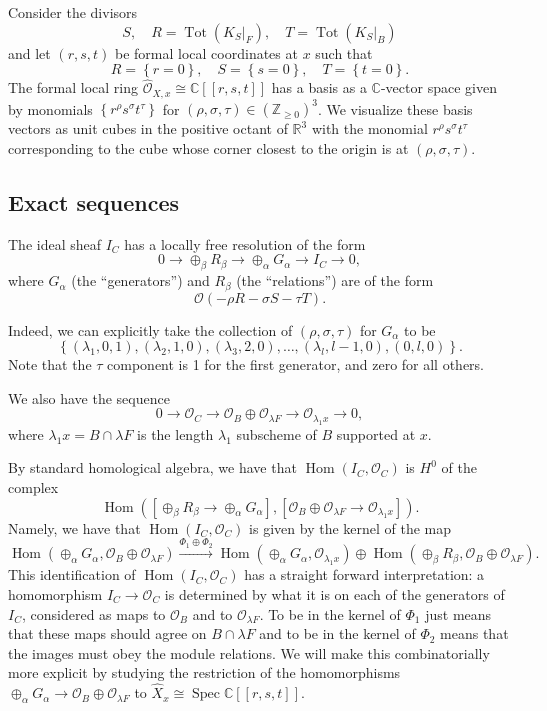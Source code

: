 \documentclass[12pt]{amsart}
\theoremstyle{definition}
\newcommand{\CC} {\mathbb{C}}          %
\newcommand{\RR} {\mathbb{R}}		%
\newcommand{\ZZ} {\mathbb{Z}}		%
\renewcommand{\O}{\mathcal{O}}
\newcommand{\Hom}{\operatorname{Hom}}
\newcommand{\Tot}{\operatorname{Tot}}
\newcommand{\Spec}{\operatorname{Spec}}
\begin{document}
Consider the divisors
\[
S,\quad R=\Tot (K_{S}|_{F}),\quad T=\Tot (K_{S}|_{B})
\]
and let $(r,s,t)$ be formal local coordinates at $x$ such that 
\[
R=\left\{r=0 \right\},\quad S=\left\{s=0 \right\},\quad T=\left\{t=0 \right\}.
\]
The formal local ring $\widehat{\O}_{X,x}\cong \CC [[r,s,t]]$ has a basis
as a $\CC$-vector space given by monomials
$\left\{r^{\rho}s^{\sigma}t^{\tau} \right\}$ for $(\rho, \sigma,
\tau)\in \left(\ZZ_{\geq 0} \right)^{3}$. We visualize these basis
vectors as unit cubes in the positive octant of $\RR^{3}$ with the
monomial $r^{\rho}s^{\sigma}t^{\tau}$ corresponding to the cube whose
corner closest to the origin is at $(\rho ,\sigma ,\tau)$.


\subsection{Exact sequences}

The ideal sheaf $I_{C}$ has a locally free resolution of the form
\begin{equation}\label{eqn: R-->G-->I_C exact sequence}
0\to \oplus_{\beta}R_{\beta} \to \oplus_{\alpha }G_{\alpha } \to I_{C}
\to 0,
\end{equation}
where $G_{\alpha}$ (the ``generators'') and $R_{\beta}$ (the
``relations'') are of the form 
\[
\O (-\rho R-\sigma S-\tau T).
\]

Indeed, we can explicitly take the collection of $(\rho ,\sigma
,\tau)$ for $G_{\alpha}$ to be 
\[
\left\{(\lambda_{1},0,1),(\lambda_{2},1,0),(\lambda_{3},2,0),\dotsc
,(\lambda_{l},l-1,0),(0,l,0) \right\}.
\]
Note that the $\tau$ component is 1 for the first generator, and zero
for all others.

We also have the sequence
\[
0\to \O_{C} \to \O_{B}\oplus\O_{\lambda F}\to \O_{\lambda_{1}x}\to 0,
\]
where $\lambda_{1}x=B\cap \lambda F$ is the length $\lambda_{1}$
subscheme of $B$ supported at $x$.

By standard homological algebra, we have that $\Hom (I_{C},\O_{C})$ is
$H^{0}$ of the complex
\[
\Hom \left(\left[\oplus_{\beta}R_{\beta}\to
\oplus_{\alpha}G_{\alpha} \right],[\O_{B}\oplus \O_{\lambda F}\to
\O_{\lambda_{1}x}] \right).
\]
Namely, we have that $\Hom (I_{C},\O_{C})$ is given by the kernel of
the map
\[
\Hom (\oplus_{\alpha}G_{\alpha},\O_{B}\oplus \O_{\lambda
F}) \xrightarrow{\Phi_{1}\oplus \Phi_{2}}
\Hom(\oplus_{\alpha}G_{\alpha},\O_{\lambda_{1}x})\oplus \Hom
(\oplus_{\beta}R_{\beta},\O_{B}\oplus \O_{\lambda F}).
\]
This identification of $\Hom (I_{C},\O_{C})$ has a straight forward
interpretation: a homomorphism $I_{C}\to \O_C$ is determined by what
it is on each of the generators of $I_{C}$, considered as maps to
$\O_{B}$ and to $\O_{\lambda F}$. To be in the kernel of $\Phi_{1}$
just means that these maps should agree on $B\cap \lambda F$ and to be
in the kernel of $\Phi_{2}$ means that the images must obey the module
relations. We will make this combinatorially more explicit by studying
the restriction of the homomorphisms $\oplus_{\alpha}G_{\alpha}\to
\O_{B}\oplus \O_{\lambda F}$ to $\widehat{X}_{x}\cong \Spec \CC
[[r,s,t]]$.
\end{document}
